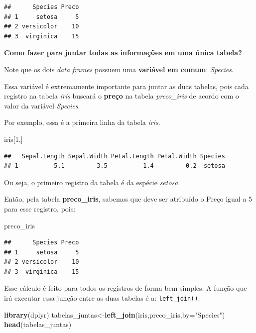 \documentclass[
]{book}
\newenvironment{Shaded}{\begin{snugshade}}{\end{snugshade}}
\newcommand{\DataTypeTok}[1]{\textcolor[rgb]{0.13,0.29,0.53}{#1}}
\newcommand{\DecValTok}[1]{\textcolor[rgb]{0.00,0.00,0.81}{#1}}
\newcommand{\KeywordTok}[1]{\textcolor[rgb]{0.13,0.29,0.53}{\textbf{#1}}}
\newcommand{\NormalTok}[1]{#1}
\newcommand{\StringTok}[1]{\textcolor[rgb]{0.31,0.60,0.02}{#1}}
\begin{document}
\begin{verbatim}
##      Species Preco
## 1     setosa     5
## 2 versicolor    10
## 3  virginica    15
\end{verbatim}

\textbf{Como fazer para juntar todas as informações em uma única
tabela?}

Note que os dois \emph{data frames} possuem uma \textbf{variável em
comum}: \emph{Species}.

Essa variável é extremamente importante para juntar as duas tabelas,
pois cada registro na tabela \emph{iris} buscará o \textbf{preço} na
tabela \emph{preco\_iris} de acordo com o valor da variável
\emph{Species}.

Por exemplo, essa é a primeira linha da tabela \emph{iris}.

\begin{Shaded}
\begin{Highlighting}[]
\NormalTok{iris[}\DecValTok{1}\NormalTok{,]}
\end{Highlighting}
\end{Shaded}

\begin{verbatim}
##   Sepal.Length Sepal.Width Petal.Length Petal.Width Species
## 1          5.1         3.5          1.4         0.2  setosa
\end{verbatim}

Ou seja, o primeiro registro da tabela é da espécie \emph{setosa}.

Então, pela tabela \textbf{preco\_iris}, sabemos que deve ser atribuído
o Preço igual a 5 para esse registro, pois:

\begin{Shaded}
\begin{Highlighting}[]
\NormalTok{preco_iris}
\end{Highlighting}
\end{Shaded}

\begin{verbatim}
##      Species Preco
## 1     setosa     5
## 2 versicolor    10
## 3  virginica    15
\end{verbatim}

Esse cálculo é feito para todos os registros de forma bem simples. A
função que irá executar essa junção entre as duas tabelas é a:
\texttt{left\_join()}.

\begin{Shaded}
\begin{Highlighting}[]
\KeywordTok{library}\NormalTok{(dplyr)}
\NormalTok{tabelas_juntas<-}\KeywordTok{left_join}\NormalTok{(iris,preco_iris,}\DataTypeTok{by=}\StringTok{"Species"}\NormalTok{)}
\KeywordTok{head}\NormalTok{(tabelas_juntas)}
\end{Highlighting}
\end{Shaded}
\end{document}
